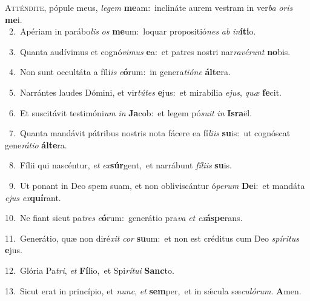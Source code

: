 \lettrine{\initial\textcolor{\initialcolor}{A}}{tténdite,} pópule meus, \textit{le}\-\textit{gem} \textbf{me}\-am:~\star inclináte aurem vestram in ver\textit{ba} \textit{o}\-\textit{ris} \textbf{me}\-i.\\
{\numbfont\textcolor{\numbcolor}{~2.}}~Apériam in parábo\textit{lis} \textit{os} \textbf{me}\-um:~\star loquar propositió\textit{nes} \textit{ab} \textit{in}\-\textbf{í}\textbf{ti}o.\par
{\numbfont\textcolor{\numbcolor}{~3.}}~Quanta audívimus et cognó\-\textit{vi}\-\textit{mus} \textbf{e}\-a:~\star et patres nostri nar\-\textit{ra}\-\textit{vé}\textit{runt} \textbf{no}\-bis.\par
{\numbfont\textcolor{\numbcolor}{~4.}}~Non sunt occultáta a fíli\textit{is} \textit{e}\-\textbf{ó}rum:~\star in genera\-\textit{ti}\-\textit{ó}\textit{ne} \textbf{ál}\-\textbf{te}ra.\par
{\numbfont\textcolor{\numbcolor}{~5.}}~Narrántes laudes Dómini, et vir\-\textit{tú}\-\textit{tes} \textbf{e}\-jus:~\star et mirabília \textit{e}\-\textit{jus}, \textit{quæ} \textbf{fe}\-cit.\par
{\numbfont\textcolor{\numbcolor}{~6.}}~Et suscitávit testimóni\textit{um} \textit{in} \textbf{Ja}\-cob:~\star et legem pó\-\textit{su}\-\textit{it} \textit{in} \textbf{Is}\-\textbf{ra}ël.\par
{\numbfont\textcolor{\numbcolor}{~7.}}~Quanta mandávit pátribus nostris nota fácere ea fí\-\textit{li}\-\textit{is} \textbf{su}\-is:~\star ut cognóscat gene\-\textit{rá}\-\textit{ti}\textit{o} \textbf{ál}\-\textbf{te}ra.\par
{\numbfont\textcolor{\numbcolor}{~8.}}~Fílii qui nascéntur, \textit{et} \textit{ex}\-\textbf{súr}gent,~\star et narrábunt \textit{fí}\-\textit{li}\textit{is} \textbf{su}\-is.\par
{\numbfont\textcolor{\numbcolor}{~9.}}~Ut ponant in Deo spem suam, et non obliviscántur ó\-\textit{pe}\-\textit{rum} \textbf{De}\-i:~\star et mandáta \textit{e}\-\textit{jus} \textit{ex}\-\textbf{quí}rant.\par
{\numbfont\textcolor{\numbcolor}{10.}}~Ne fiant sicut pa\textit{tres} \textit{e}\-\textbf{ó}rum:~\star generátio pra\textit{va} \textit{et} \textit{ex}\-\textbf{ás}\textbf{pe}rans.\par
{\numbfont\textcolor{\numbcolor}{11.}}~Generátio, quæ non diré\textit{xit} \textit{cor} \textbf{su}\-um:~\star et non est créditus cum Deo \textit{spí}\-\textit{ri}\textit{tus} \textbf{e}\-jus.\par
{\numbfont\textcolor{\numbcolor}{12.}}~Glória Pa\-\textit{tri}\-, \textit{et} \textbf{Fí}\-lio,~\star et Spi\-\textit{rí}\-\textit{tu}\textit{i} \textbf{Sanc}\-to.\par
{\numbfont\textcolor{\numbcolor}{13.}}~Sicut erat in princípio, et \textit{nunc}\-, \textit{et} \textbf{sem}\-per,~\star et in sǽcula sæ\-\textit{cu}\-\textit{ló}\textit{rum}. \textbf{A}\-men.\par
